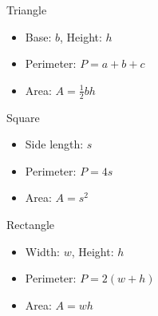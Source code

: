\documentclass[twocolumn,a4]{article}
\begin{document}
Triangle \\
\begin{minipage}{0.5\linewidth}
    \begin{itemize}
        \item Base: $b$, Height: $h$
        \item Perimeter: $P = a + b + c$
        \item Area: $A = \frac{1}{2} b h$
    \end{itemize}
\end{minipage}
\begin{minipage}{0.4\linewidth}
\end{minipage}

Square \\
\begin{minipage}{0.4\linewidth}
	\begin{itemize}
	    \item Side length: $s$
	    \item Perimeter: $P = 4s$
	    \item Area: $A = s^2$
	\end{itemize}
\end{minipage}
\begin{minipage}{0.4\linewidth}
\end{minipage}

Rectangle \\
\begin{minipage}{0.4\linewidth}
	\begin{itemize}
	    \item Width: $w$, Height: $h$
	    \item Perimeter: $P = 2(w + h)$
	    \item Area: $A = wh$
	\end{itemize}
\end{minipage}
\begin{minipage}{0.4\linewidth}
\end{minipage}
\end{document}
